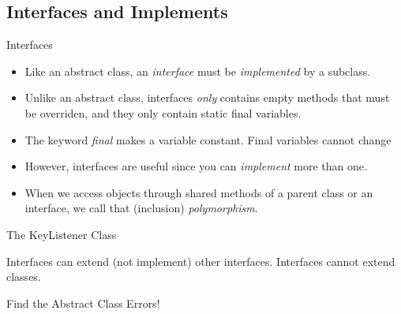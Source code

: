 \subsection{Interfaces and Implements}
\begin{frame}{Interfaces}
\begin{itemize}
\item Like an abstract class, an \emph{interface} must be \emph{implemented} by a subclass. \pause
\item Unlike an abstract class, interfaces \emph{only} contains empty methods that must be overriden, and they only contain static final variables. \pause
\item The keyword \emph{final} makes a variable constant. Final variables cannot change \pause
\item However, interfaces are useful since you can \emph{implement} more than one.
\item When we access objects through shared methods of a parent class or an interface, we call that (inclusion) \emph{polymorphism}.
\end{itemize}
\end{frame}

\begin{frame}[fragile]{The KeyListener Class}
\begin{semiverbatim}\end{semiverbatim}
\begin{center}
Interfaces can extend (not implement) other interfaces. Interfaces cannot extend classes.
\end{center}
\end{frame}

\begin{frame}[fragile]{Find the Abstract Class Errors!}
\begin{semiverbatim}\end{semiverbatim}

\end{frame}

